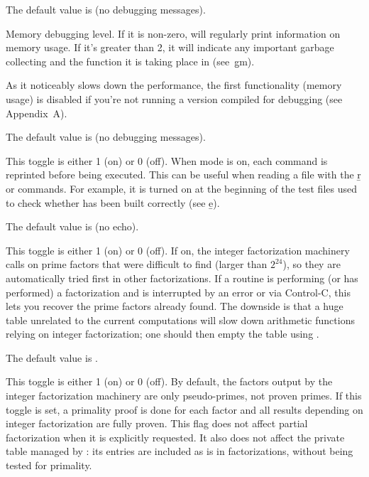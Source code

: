 {The default value is  (no debugging messages).

\label{se:def,debugmem}
Memory debugging level. If it is non-zero,  will regularly print
information on memory usage. If it's greater than 2, it will indicate any
important garbage collecting and the function it is taking place in
(see~\b{gm}).

 As it noticeably slows down the performance,
the first functionality (memory usage) is disabled if you're not running a
version compiled for debugging (see Appendix~A).

The default value is  (no debugging messages).

\label{se:def,echo}
This toggle is either 1 (on) or 0 (off). When 
mode is on, each command is reprinted before being executed. This can be
useful when reading a file with the \b{r} or  commands. For
example, it is turned on at the beginning of the test files used to check
whether  has been built correctly (see \b{e}).

The default value is  (no echo).

\label{se:def,factor_add_primes}
This toggle is either 1 (on) or 0 (off). If on,
the integer factorization machinery calls  on prime
factors that were difficult to find (larger than $2^{24}$), so they are
automatically tried first in other factorizations. If a routine is performing
(or has performed) a factorization and is interrupted by an error or via
Control-C, this lets you recover the prime factors already found. The
downside is that a huge  table unrelated to the current
computations will slow down arithmetic functions relying on integer
factorization; one should then empty the table using .

The default value is .

\label{se:def,factor_proven}
This toggle is either 1 (on) or 0 (off). By
default, the factors output by the integer factorization machinery are
only pseudo-primes, not proven primes. If this toggle is
set, a primality proof is done for each factor and all results depending on
integer factorization are fully proven. This flag does not affect partial
factorization when it is explicitly requested. It also does not affect the
private table managed by : its entries are included as is in
factorizations, without being tested for primality.

}
